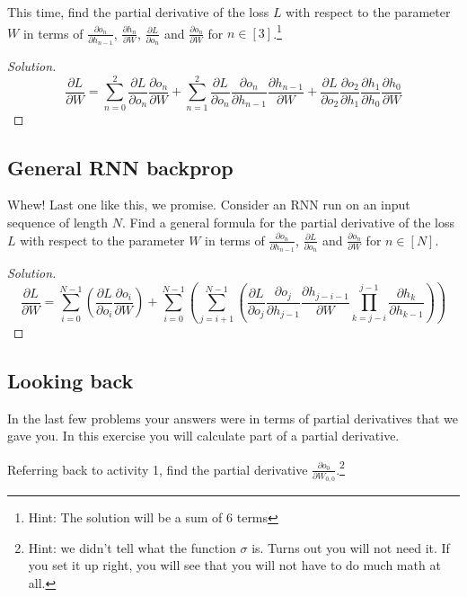 \documentclass{article}
\begin{document}
This time, find the partial derivative of the loss $L$ with respect to the parameter $W$ in terms of $\frac{\partial o_n}{\partial h_{n-1}}$, $\frac{\partial h_n}{\partial W}$, $\frac{\partial L}{\partial o_n}$ and $\frac{\partial o_n}{\partial W}$ for $n \in [3]$.\footnote{Hint: The solution will be a sum of 6 terms}

\begin{proof}[Solution]
    $$ \frac{\partial L}{\partial W} = \sum_{n = 0}^2 \frac{\partial L}{\partial o_n}\frac{\partial o_n}{\partial W} + \sum_{n = 1}^2 \frac{\partial L}{\partial o_n}\frac{\partial o_n}{\partial h_{n - 1}} \frac{\partial h_{n-1}}{\partial W} + \frac{\partial L}{\partial o_2}\frac{\partial o_2}{\partial h_1}\frac{\partial h_1}{\partial h_0} \frac{\partial h_0}{\partial W} $$
\end{proof}

\subsection{General RNN backprop}
Whew! Last one like this, we promise. Consider an RNN run on an input sequence of length $N$. Find a general formula for the partial derivative of the loss $L$ with respect to the parameter $W$ in terms of $\frac{\partial o_n}{\partial h_{n-1}}$, $\frac{\partial L}{\partial o_n}$ and $\frac{\partial o_n}{\partial W}$ for $n \in [N]$.

\begin{proof}[Solution]
    $$ \frac{\partial L}{\partial W} =
    \sum_{i = 0}^{N - 1} \left( \frac{\partial L}{\partial o_i} \frac{\partial o_i}{\partial W} \right) +
    \sum_{i = 0}^{N - 1} \left( \sum_{j = i + 1}^{N - 1} \left( \frac{\partial L}{\partial o_j} \frac{\partial o_j}{\partial h_{j - 1}} \frac{\partial h_{j - i - 1}}{\partial W} \prod_{k = j - i}^{j - 1} \frac{\partial h_k}{\partial h_{k - 1}} \right)\right)$$
\end{proof}

\subsection{Looking back}
In the last few problems your answers were in terms of partial derivatives that we gave you. In this exercise you will calculate part of a partial derivative.

Referring back to activity 1, find the partial derivative $\frac{\partial o_{0}}{\partial W_{0,0}}$.\footnote{Hint: we didn't tell what the function $\sigma$ is. Turns out you will not need it. If you set it up right, you will see that you will not have to do much math at all.}
\end{document}
